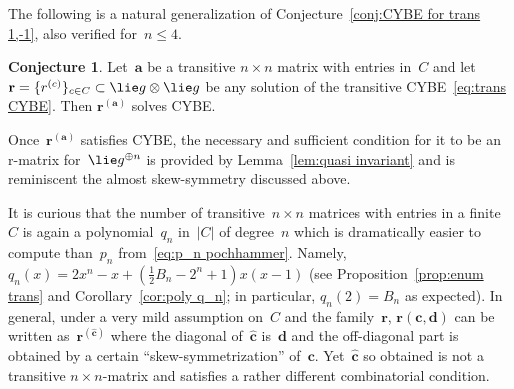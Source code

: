 \documentclass[12pt, reqno]{amsart}
\theoremstyle{definition}
\newtheorem{conjecture}[theorem]{Conjecture}
\numberwithin{equation}{section}
\newcommand{\tensor}{\otimes}
\begin{document}
The following is a natural generalization of Conjecture~\ref{conj:CYBE for trans 1,-1}, also  verified for~$n\le 4$.
\begin{conjecture}\label{conj:CYBE for trans}
Let~$\boldsymbol{a}$ be a
transitive $n\times n$ matrix with entries in~$C$
and let~$\mathbf r=\{r^{(c)}\}_{c\in C}\subset \lie g\tensor \lie g$
be any solution of the transitive CYBE~\eqref{eq:trans CYBE}. Then
     $\mathbf r^{(\boldsymbol{a})}$ solves CYBE.
\end{conjecture}
Once~$\mathbf r^{(\boldsymbol{a})}$
satisfies CYBE, the necessary and sufficient 
condition for it to be an r-matrix for~$\lie g^{\oplus n}$ is provided by Lemma~\ref{lem:quasi invariant}
and is reminiscent the almost skew-symmetry discussed above.

It is curious that the number of transitive~$n\times n$ matrices with entries
in a finite~$C$ is again a polynomial~$q_n$ in~$|C|$ of degree~$n$ which is dramatically easier to compute than~$p_n$ from~\eqref{eq:p_n pochhammer}. Namely,
$q_n(x)=2x^n-x+(\frac12 B_n-2^n+1)x(x-1)$ 
(see Proposition~\ref{prop:enum trans} and
Corollary~\ref{cor:poly q_n}; in particular, $q_n(2)=B_n$ as expected).
In general, under a very mild assumption on~$C$ and the family~$\mathbf r$, 
$\mathbf r(\mathbf c,\boldsymbol d)$ can be
written as~$\mathbf r^{(\widehat{\mathbf c})}$
where the diagonal of~$\widehat{\mathbf c}$ is~$\boldsymbol{d}$ and the off-diagonal part is
obtained by a certain ``skew-symmetrization'' of~$\mathbf c$. 
Yet~$\widehat{\mathbf c}$ so obtained is not
a transitive $n\times n$-matrix and satisfies a rather different
combinatorial condition. 
\end{document}
